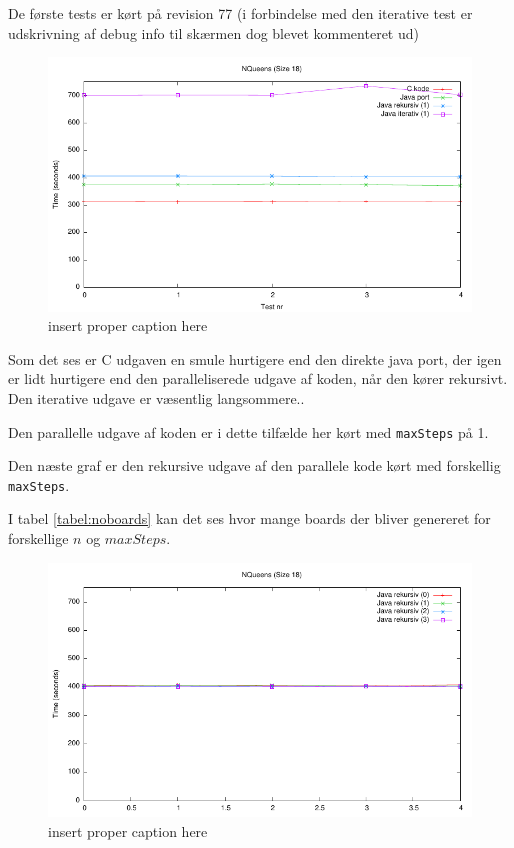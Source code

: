 De første tests er kørt på revision 77 (i forbindelse med den iterative test er
udskrivning af debug info til skærmen dog blevet kommenteret ud)

\begin{figure}[h]
\begin{center}
\includegraphics{../benchmarks/b1.pdf}
\caption{insert proper caption here } 
\label{plot:b1}
\end{center}
\end{figure}

Som det ses er C udgaven en smule hurtigere end den direkte java port, der igen
er lidt hurtigere end den paralleliserede udgave af koden, når den kører
rekursivt. Den iterative udgave er væsentlig langsommere..

Den parallelle udgave af koden er i dette tilfælde her kørt med
\texttt{maxSteps} på 1. 

Den næste graf er den rekursive udgave af den parallele kode kørt med forskellig
\texttt{maxSteps}. 

I tabel \ref{tabel:noboards} kan det ses hvor mange boards der bliver genereret
for forskellige $n$ og $maxSteps$. 

\begin{figure}[h]
\begin{center}
\includegraphics{../benchmarks/b2.pdf}
\caption{insert proper caption here } 
\label{plot:b2}
\end{center}
\end{figure}

